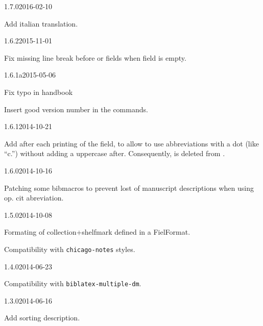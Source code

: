 \documentclass{ltxdockit}[2011/03/25]
\begin{document}
\begin{changelog}
\begin{release}{1.7.0}{2016-02-10}
	\item Add italian translation.
\end{release}

\begin{release}{1.6.2}{2015-11-01}
	\item Fix missing line break before  or  fields when  field is empty.
\end{release}

\begin{release}{1.6.1a}{2015-05-06}
	\item Fix typo in handbook
	\item Insert good version number in the  commands.
\end{release}

\begin{release}{1.6.1}{2014-10-21}	
  	\item Add  after each printing of the  field, to allow to use abbreviations with a dot (like \enquote{c.}) without adding a uppercase after. Consequently,  is deleted from .
\end{release}

\begin{release}{1.6.0}{2014-10-16}	
  	\item Patching some bibmacros to prevent lost of manuscript descriptions when using  op. cit abreviation.
\end{release}

\begin{release}{1.5.0}{2014-10-08}	
  	\item Formating of collection+shelfmark defined in a FielFormat.
	\item Compatibility with \verb+chicago-notes+ styles.
\end{release}

\begin{release}{1.4.0}{2014-06-23}
	\item Compatibility with \verb+biblatex-multiple-dm+.
\end{release}


\begin{release}{1.3.0}{2014-06-16}
	\item Add sorting description.
\end{release}


\end{changelog}
\end{document}
